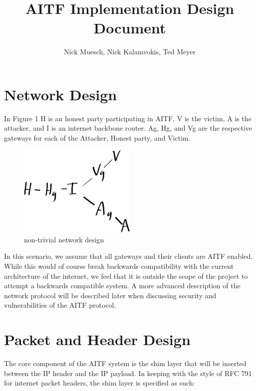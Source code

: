 \documentclass[11pt]{article}
\title{\textbf{AITF Implementation Design Document}}
\author{Nick Muesch, Nick Kalamvokis, Ted Meyer}
\date{}
\begin{document}
\maketitle

\section{Network Design}

In Figure 1 H is an honest party participating in AITF, V is the victim, A is
the attacker, and I is an internet backbone router. Ag, Hg, and Vg are the
respective gateways for each of the Attacker, Honest party, and Victim. 
\begin{figure}[h!]
 \caption{non-trivial network design}
 \centering
  \includegraphics[width=0.5\textwidth]{network}
\end{figure}
In this scenario, we assume that all gateways and their clients are AITF
enabled. While this would of course break backwards compatibility with the
current architecture of the internet, we feel that it is outside the scope of
the project to attempt a backwards compatible system. A more advanced
description of the network protocol will be described later when discussing
security and vulnerabilities of the AITF protocol.

\newpage

\section{Packet and Header Design}
The core component of the AITF system is the shim layer that will be inserted
between the IP header and the IP payload. In keeping with the style of RFC 791
for internet packet headers, the shim layer is specified as such:

\texttt{}
\end{document}
